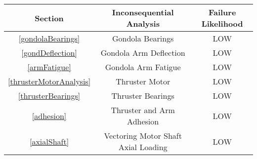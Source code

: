 \documentclass[../main.tex]{subfiles}
\begin{document}
\begin{center}
	 \label{inconsequentialAnalysis}
	\begin{tabular}{|c|c|c|}
	\hline
	\textbf{Section} &\textbf{Inconsequential Analysis} & \textbf{Failure Likelihood} \\
	\hline
	\ref{gondolaBearings} & Gondola Bearings & LOW \\
	\hline
	\ref{gondDeflection} & Gondola Arm Deflection  & LOW \\
	\hline
	\ref{armFatigue} & Gondola Arm Fatigue & LOW \\
	\hline
	\ref{thrusterMotorAnalysis} & Thruster Motor & LOW \\
	\hline
	\ref{thrusterBearings} & Thruster Bearings & LOW \\
	\hline
	\ref{adhesion} & Thruster and Arm Adhesion & LOW \\
	\hline
	\ref{axialShaft} & Vectoring Motor Shaft Axial Loading & LOW \\
	\hline
	\end{tabular}
\end{center}
\end{document}
